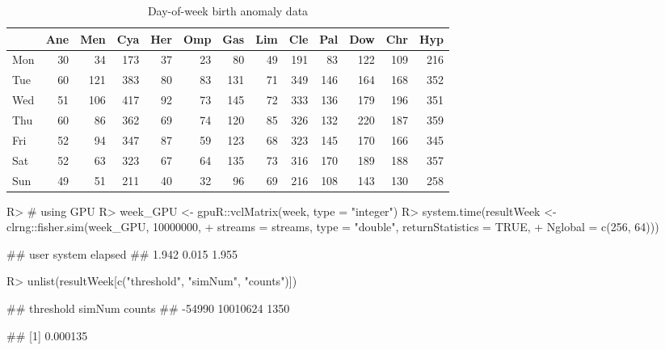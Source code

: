 \documentclass[article,nojss]{jss}\usepackage[]{graphicx}\usepackage[]{color}
\begin{document}
\begin{table}

\caption{\label{tab:weekdata}Day-of-week birth anomaly data\label{tab:week}}
\centering
\begin{tabular}[t]{lrrrrrrrrrrrr}
\toprule
  & Ane & Men & Cya & Her & Omp & Gas & Lim & Cle & Pal & Dow & Chr & Hyp\\
\midrule
Mon & 30 & 34 & 173 & 37 & 23 & 80 & 49 & 191 & 83 & 122 & 109 & 216\\
Tue & 60 & 121 & 383 & 80 & 83 & 131 & 71 & 349 & 146 & 164 & 168 & 352\\
Wed & 51 & 106 & 417 & 92 & 73 & 145 & 72 & 333 & 136 & 179 & 196 & 351\\
Thu & 60 & 86 & 362 & 69 & 74 & 120 & 85 & 326 & 132 & 220 & 187 & 359\\
Fri & 52 & 94 & 347 & 87 & 59 & 123 & 68 & 323 & 145 & 170 & 166 & 345\\
Sat & 52 & 63 & 323 & 67 & 64 & 135 & 73 & 316 & 170 & 189 & 188 & 357\\
Sun & 49 & 51 & 211 & 40 & 32 & 96 & 69 & 216 & 108 & 143 & 130 & 258\\
\bottomrule
\end{tabular}
\end{table}


\begin{CodeChunk}
\begin{CodeInput}
R> # using GPU
R> week_GPU <- gpuR::vclMatrix(week, type = "integer")
R> system.time(resultWeek <- clrng::fisher.sim(week_GPU, 10000000,
+    streams = streams, type = "double", returnStatistics = TRUE,
+    Nglobal = c(256, 64)))
\end{CodeInput}
\begin{CodeOutput}
##    user  system elapsed 
##   1.942   0.015   1.955
\end{CodeOutput}
\begin{CodeInput}
R> unlist(resultWeek[c("threshold", "simNum", "counts")])
\end{CodeInput}
\begin{CodeOutput}
## threshold    simNum    counts 
##    -54990  10010624      1350
\end{CodeOutput}
\begin{CodeOutput}
## [1] 0.000135
\end{CodeOutput} 
\end{CodeChunk} 
\end{document}
